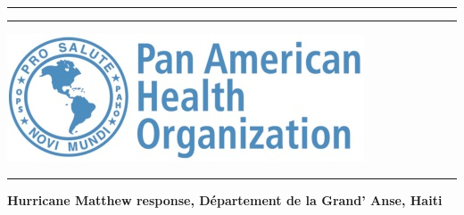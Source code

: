\begin{titlepage}

\hspace*{-1cm}\begin{minipage}[t][0.1\textheight]{5cm}
\textcolor{whoblue!15}{\rule{5cm}{0.1\textheight}}
\end{minipage}
\hspace*{1cm}\begin{minipage}[t]{11.3cm}
\textcolor{whoblue}{\rule{11.3cm}{0.5mm}}
\end{minipage}

\hspace*{-1cm}\begin{minipage}[t][0.1\textheight]{5cm}
\vspace{0pt}
\includegraphics[height=0.1\textheight]{../figure/logo_paho.png}\\[0.55cm]
\textcolor{whoblue!15}{\rule{5cm}{0.1\textheight}}
\end{minipage}
\hspace*{1cm}\begin{minipage}[t][0.2\textheight]{11.3cm}{}
\vspace{0pt}
\begin{flushright}
\begin{spacing}{2.0}
{\huge \textbf{Hurricane Matthew response, Département de la Grand’ Anse, Haiti}}
\end{spacing}
\end{flushright}
\end{minipage}


\end{titlepage}
